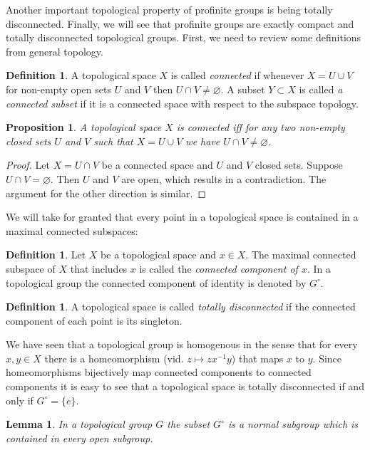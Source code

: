 \documentclass[12pt]{article}
\newtheorem{prop}[thm]{Proposition}
\newtheorem{lem}[thm]{Lemma}
\theoremstyle{definition}
\newtheorem{dfn}[thm]{Definition}
\theoremstyle{remark}
\newcommand{\gcirc}{G^\circ}
\begin{document}
    Another important topological property of profinite groups is being totally disconnected. Finally, we will see that profinite groups are exactly compact and totally disconnected topological groups. First, we need to review some definitions from general topology.

    \begin{dfn}
        A topological space $X$ is called \emph{connected} if whenever $X=U\cup V$ for non-empty open sets $U$ and $V$ then $U\cap V\neq\varnothing$. A subset $Y\subset X$ is called \emph{a connected subset} if it is a connected space with respect to the subspace topology.
    \end{dfn}

    \begin{prop}
        A topological space $X$ is connected iff for any two non-empty closed sets $U$ and $V$ such that $X=U\cup V$ we have $U\cap V\neq\varnothing$.
    \end{prop}
    \begin{proof}
        Let $X=U\cap V$ be a connected space and $U$ and $V$ closed sets. Suppose $U\cap V=\varnothing$. Then $U$ and $V$ are open, which results in a contradiction. The argument for the other direction is similar.
    \end{proof}

    We will take for granted that every point in a topological space is contained in a maximal connected subspaces:
    \begin{dfn}
        Let $X$ be a topological space and $x\in X$. The maximal connected subspace of $X$ that includes $x$ is called the \emph{connected component of $x$}. In a topological group the connected component of identity is denoted by $G^\circ$.
    \end{dfn}

    \begin{dfn}
        A topological space is called \emph{totally disconnected} if the connected component of each point is its singleton.
    \end{dfn}

    We have seen that a topological group is homogenous in the sense that for every $x,y\in X$ there is a homeomorphism (vid. $z\mapsto zx^{-1}y$) that maps $x$ to $y$. Since homeomorphisms bijectively map connected components to connected components it is easy to see that a topological space is totally disconnected if and only if $G^\circ=\{e\}$.

    \begin{lem}\label{lem:gcirc}
        In a topological group $G$ the subset $\gcirc$ is a normal subgroup which is contained in every open subgroup.
    \end{lem}
\end{document}
